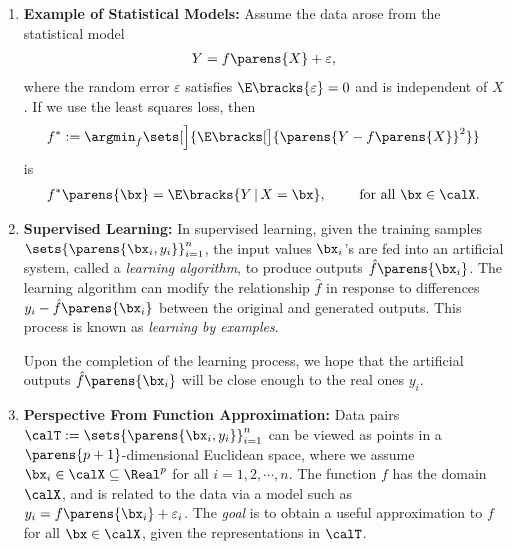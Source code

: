 \documentclass[12pt]{article}
\begin{document}
\begin{enumerate}[label=\textbf{\arabic*.}]


	\item \textbf{Example of Statistical Models:} Assume the data arose from the statistical model 
	\begin{align}\label{add.error}
		Y = f \parens{X} + \varepsilon, 
	\end{align} 
	where the random error $\varepsilon$ satisfies $\E \bracks{\varepsilon} = 0$ and is independent of $X$. If we use the least squares loss, then 
	\begin{align*}
		f^* := \argmin_{f} \sets[\Big]{ \E \bracks[\big]{ \parens{Y - f \parens{X}}^2 }}
	\end{align*}
	is 
	\begin{align*}
		f^* \parens{\bx} = \E \bracks{Y \,\vert\, X = \bx}, \qquad \text{ for all } \bx \in \calX. 
	\end{align*}
	
	\item \textbf{Supervised Learning:} In supervised learning, given the training samples $\sets{\parens{\bx_i, y_i}}_{i=1}^n$, the input values $\bx_i$'s are fed into an artificial system, called a \textit{learning algorithm}, to produce outputs $\hat{f} \parens{\bx_i}$. The learning algorithm can modify the relationship $\hat{f}$ in response to differences $y_i - \hat{f} \parens{\bx_i}$ between the original and generated outputs. This process is known as \textit{learning by examples}. 
	
	Upon the completion of the learning process, we hope that the artificial outputs $\hat{f} \parens{\bx_i}$ will be close enough to the real ones $y_i$. 
	
	\item \textbf{Perspective From Function Approximation:} Data pairs $\calT := \sets{\parens{\bx_i, y_i}}_{i=1}^n$ can be viewed as points in a $\parens{p+1}$-dimensional Euclidean space, where we assume $\bx_i \in \calX \subseteq \Real^p$ for all $i = 1, 2, \cdots, n$. The function $f$ has the domain $\calX$, and is related to the data via a model such as $y_i = f \parens{\bx_i} + \varepsilon_i$. The \emph{goal} is to obtain a useful approximation to $f$ for all $\bx \in \calX$, given the representations in $\calT$. 
	

\end{enumerate}
\end{document}
